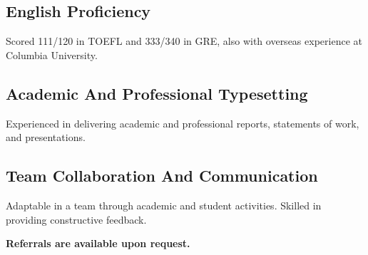 \documentclass[10.5pt,a4paper]{article}
\begin{document}
\subsection{English Proficiency}
Scored 111/120 in TOEFL and 333/340 in GRE, also with overseas experience at Columbia University. 

\subsection{Academic And Professional Typesetting}
Experienced in delivering academic and professional reports, statements of work, and presentations.

\subsection{Team Collaboration And Communication}
Adaptable in a team through academic and student activities. Skilled in providing constructive feedback.

\vfill
\begin{center}
    \textbf{Referrals are available upon request.}
\end{center}
\end{document}
